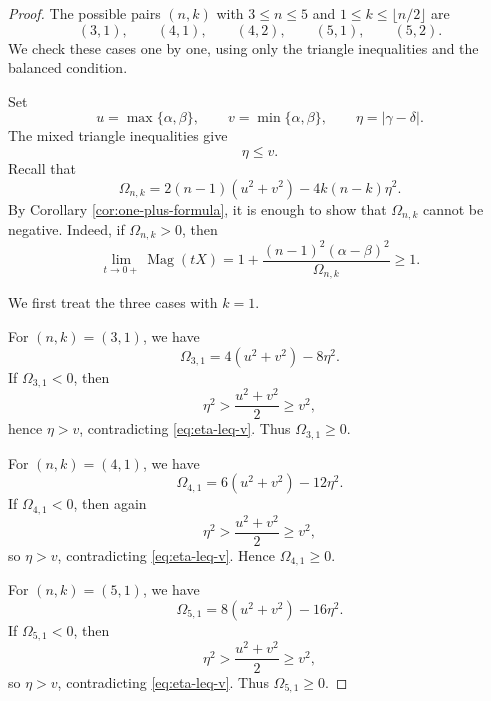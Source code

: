 \documentclass[10pt,a4paper]{amsart}
\DeclareMathOperator{\Mag}{Mag}
\begin{document}
\begin{proof}
The possible pairs \((n,k)\) with \(3\leq n\leq 5\) and
\(1\leq k\leq \lfloor n/2\rfloor\) are
\begin{equation}\label{eq:small-n-all-pairs}
(3,1),\qquad (4,1),\qquad (4,2),\qquad (5,1),\qquad (5,2).
\end{equation}
We check these cases one by one, using only the triangle inequalities and the
balanced condition.

Set
\begin{equation}\label{eq:u-v-eta}
u=\max\{\alpha,\beta\},
\qquad
v=\min\{\alpha,\beta\},
\qquad
\eta=|\gamma-\delta|.
\end{equation}
The mixed triangle inequalities give
\begin{equation}\label{eq:eta-leq-v}
\eta\leq v.
\end{equation}
Recall that
\begin{equation}\label{eq:Omega-small-proof}
\Omega_{n,k}
=
2(n-1)(u^2+v^2)-4k(n-k)\eta^2.
\end{equation}
By Corollary \ref{cor:one-plus-formula}, it is enough to show that
\(\Omega_{n,k}\) cannot be negative.  Indeed, if \(\Omega_{n,k}>0\), then
\[
\lim_{t\to 0+}\Mag(tX)
=
1+\frac{(n-1)^2(\alpha-\beta)^2}{\Omega_{n,k}}
\geq 1.
\]

We first treat the three cases with \(k=1\).

For \((n,k)=(3,1)\), we have
\begin{equation}\label{eq:n3k1-Omega}
\Omega_{3,1}=4(u^2+v^2)-8\eta^2.
\end{equation}
If \(\Omega_{3,1}<0\), then
\begin{equation}\label{eq:n3k1-contradiction}
\eta^2>\frac{u^2+v^2}{2}\geq v^2,
\end{equation}
hence \(\eta>v\), contradicting \eqref{eq:eta-leq-v}.  Thus
\(\Omega_{3,1}\geq 0\).

For \((n,k)=(4,1)\), we have
\begin{equation}\label{eq:n4k1-Omega}
\Omega_{4,1}=6(u^2+v^2)-12\eta^2.
\end{equation}
If \(\Omega_{4,1}<0\), then again
\begin{equation}\label{eq:n4k1-contradiction}
\eta^2>\frac{u^2+v^2}{2}\geq v^2,
\end{equation}
so \(\eta>v\), contradicting \eqref{eq:eta-leq-v}.  Hence
\(\Omega_{4,1}\geq 0\).

For \((n,k)=(5,1)\), we have
\begin{equation}\label{eq:n5k1-Omega}
\Omega_{5,1}=8(u^2+v^2)-16\eta^2.
\end{equation}
If \(\Omega_{5,1}<0\), then
\begin{equation}\label{eq:n5k1-contradiction}
\eta^2>\frac{u^2+v^2}{2}\geq v^2,
\end{equation}
so \(\eta>v\), contradicting \eqref{eq:eta-leq-v}.  Thus
\(\Omega_{5,1}\geq 0\).


\end{proof}
\end{document}
